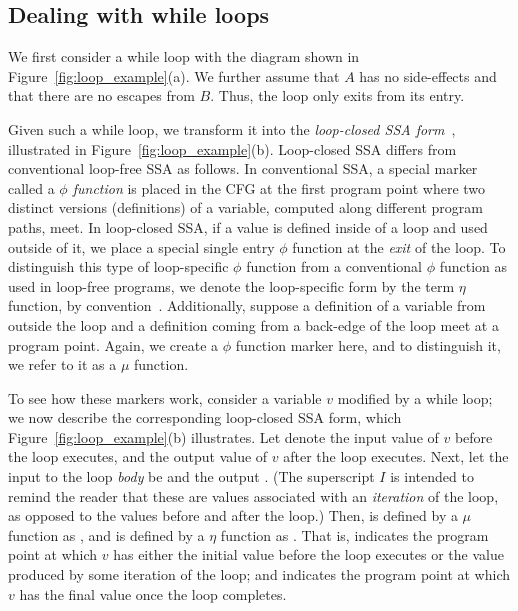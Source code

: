 \documentclass[12pt]{gatech-thesis}
\begin{document}
\subsection{Dealing with while loops}
\label{sec:while-loops}

We first consider a while loop with the diagram shown in Figure~\ref{fig:loop_example}(a).
We further assume that $A$ has no side-effects %
%
%
and that there are no escapes from $B$.
Thus, the loop only exits from its entry.  

Given such a while loop, we transform it into the \emph{loop-closed SSA form}~\cite{Pop2009}, illustrated in Figure~\ref{fig:loop_example}(b).
Loop-closed SSA differs from conventional loop-free SSA as follows.
In conventional SSA, a special marker called a \emph{$\phi$ function} is placed in the CFG at the first program point where two distinct versions (definitions) of a variable, computed along different program paths, meet.
%
In loop-closed SSA, if a value is defined inside of a loop and used outside of it, we place a special single entry $\phi$ function at the \emph{exit} of the loop.
To distinguish this type of loop-specific $\phi$ function from a conventional $\phi$ function as used in loop-free programs, we denote the loop-specific form by the term $\eta$ function, by convention~\cite{RobertA.Ballance1990}.
Additionally, suppose a definition of a variable from outside the loop and a definition coming from a back-edge of the loop meet at a program point.
Again, we create a $\phi$ function marker here, and to distinguish it, we refer to it as a $\mu$ function.

To see how these markers work, consider a variable $v$ modified by a while loop;
we now describe the corresponding loop-closed SSA form, which Figure~\ref{fig:loop_example}(b) illustrates.
Let \vinit denote the input value of $v$ before the loop executes, and \vfinal the output value of $v$ after the loop executes.
Next, let the input to the loop \emph{body} be \vmu and the output \viter.
(The superscript $I$ is intended to remind the reader that these are values associated with an \emph{iteration} of the loop, as opposed to the values before and after the loop.)
Then, \vmu is defined by a $\mu$ function as \mufunc, and \vfinal is defined by a $\eta$ function as \etafunc.
That is, \mufunc indicates the program point at which $v$ has either the initial value before the loop executes or the value produced by some iteration of the loop;
and \etafunc indicates the program point at which $v$ has the final value once the loop completes.
\end{document}
